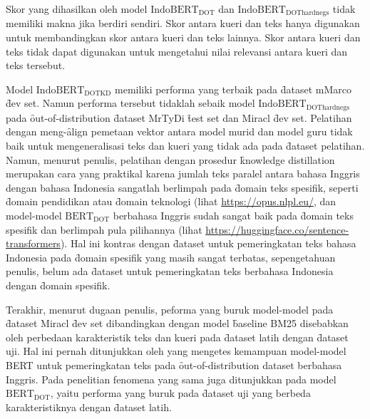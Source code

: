 Skor yang dihasilkan oleh model $\text{IndoBERT}_{\text{DOT}}$ dan $\text{IndoBERT}_{\text{DOThardnegs}}$ tidak memiliki makna jika berdiri sendiri. Skor antara kueri dan teks hanya digunakan untuk membandingkan skor antara kueri dan teks lainnya. Skor antara kueri dan teks tidak dapat digunakan untuk mengetahui nilai relevansi antara kueri dan teks tersebut.

Model $\text{IndoBERT}_{\text{DOTKD}}$ memiliki performa yang terbaik pada \f{dataset} mMarco \f{dev set}. Namun performa tersebut tidaklah sebaik model $\text{IndoBERT}_{\text{DOThardnegs}}$ pada \f{out-of-distribution} \f{dataset} MrTyDi \f{test set} dan Miracl \f{dev set}. Pelatihan dengan meng-\f{align} pemetaan vektor antara model murid dan model guru tidak baik untuk mengeneralisasi teks dan kueri yang tidak ada pada \f{dataset} pelatihan. Namun, menurut penulis, pelatihan dengan prosedur \f{knowledge distillation} merupakan cara yang praktikal karena jumlah teks paralel antara bahasa Inggris dengan bahasa Indonesia sangatlah berlimpah pada \f{domain} teks spesifik, seperti \f{domain} pendidikan atau \f{domain} teknologi (lihat \url{https://opus.nlpl.eu/}, dan model-model $\text{BERT}_{\text{DOT}}$ berbahasa Inggris sudah sangat baik pada \f{domain} teks spesifik dan berlimpah pula pilihannya (lihat \url{https://huggingface.co/sentence-transformers}). Hal ini kontras dengan \f{dataset} untuk pemeringkatan teks bahasa Indonesia pada \f{domain} spesifik yang masih sangat terbatas, sepengetahuan penulis, belum ada \f{dataset} untuk pemeringkatan teks berbahasa Indonesia dengan \f{domain} spesifik.

Terakhir, menurut dugaan penulis, peforma yang buruk model-model pada \f{dataset} Miracl \f{dev set} dibandingkan dengan model \f{baseline} BM25 disebabkan oleh perbedaan karakteristik teks dan kueri pada \f{dataset} latih dengan \f{dataset} uji. Hal ini pernah ditunjukkan oleh \cite{beir} yang mengetes kemampuan model-model BERT untuk pemeringkatan teks pada \f{out-of-distribution dataset} berbahasa Inggris. Pada penelitian \cite{beir} fenomena yang sama juga ditunjukkan pada model $\text{BERT}_{\text{DOT}}$, yaitu performa yang buruk pada \f{dataset} uji yang berbeda karakteristiknya dengan \f{dataset} latih.

